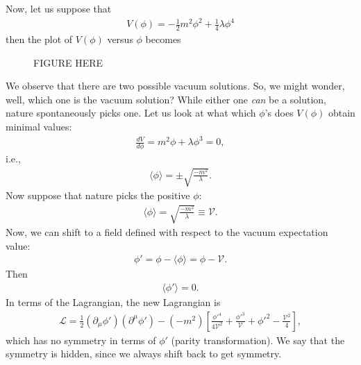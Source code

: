 \documentclass[a4paper,11pt]{article}
\numberwithin{equation}{section}
\theoremstyle{definition}
\newcommand{\p}{\partial}
\newcommand{\lag}{\mathcal{L}}
\begin{document}
Now, let us suppose that 
\begin{align}
V(\phi) = -\frac{1}{2}m^2\phi^2 + \frac{1}{4}\lambda \phi^4
\end{align}
then the plot of $V(\phi)$ versus $\phi$ becomes
\begin{figure}[h!]
	FIGURE HERE
\end{figure}
We observe that there are two possible vacuum solutions. So, we might wonder, well, which one is the vacuum solution? While either one \textit{can} be a solution, nature spontaneously picks one. Let us look at what which $\phi$'s does $V(\phi)$ obtain minimal values:
\begin{align}
\frac{dV}{d\phi} = m^2\phi + \lambda \phi^3 = 0,
\end{align}
i.e.,
\begin{align}
\langle \phi \rangle = \pm \sqrt{\frac{-m^2}{\lambda}}.
\end{align}
Now suppose that nature picks the positive $\phi$:
\begin{align}
\langle \phi \rangle = \sqrt{\frac{-m^2}{\lambda}} \equiv \mathcal{V}.
\end{align}
Now, we can shift to a field defined with respect to the vacuum expectation value:
\begin{align}
\phi' = \phi - \langle \phi \rangle = \phi - \mathcal{V}.
\end{align}
Then 
\begin{align}
\langle \phi' \rangle = 0.
\end{align}
In terms of the Lagrangian, the new Lagrangian is
\begin{align}
\lag = \frac{1}{2}(\p_\mu\phi')(\p^\mu\phi') - (-m^2)\left[ \frac{\phi'^4}{4\mathcal{V}^2} + \frac{\phi'^3}{\mathcal{V}} + \phi'^2 - \frac{\mathcal{V}^2}{4} \right],
\end{align}
which has no symmetry in terms of $\phi'$ (parity transformation). We say that the symmetry is hidden, since we always shift back to get symmetry.\\
\end{document}
